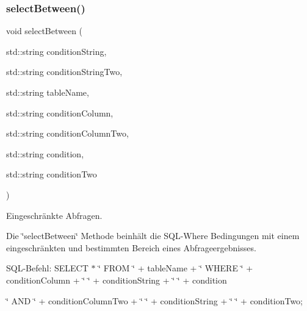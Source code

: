 \subsubsection{select\+Between()}
{\footnotesize\ttfamily void select\+Between (\begin{DoxyParamCaption}\item[{std\+::string}]{condition\+String,  }\item[{std\+::string}]{condition\+String\+Two,  }\item[{std\+::string}]{table\+Name,  }\item[{std\+::string}]{condition\+Column,  }\item[{std\+::string}]{condition\+Column\+Two,  }\item[{std\+::string}]{condition,  }\item[{std\+::string}]{condition\+Two }\end{DoxyParamCaption})}



Eingeschränkte Abfragen. 

Die \char`\"{}select\+Between\char`\"{} Methode beinhält die S\+Q\+L-\/\+Where Bedingungen mit einem eingeschränkten und bestimmten Bereich eines Abfrageergebnisses.~\newline


S\+Q\+L-\/\+Befehl\+: S\+E\+L\+E\+CT $\ast$ \char`\"{} F\+R\+O\+M \char`\"{} + table\+Name + \char`\"{} W\+H\+E\+R\+E \char`\"{} + condition\+Column + \char`\"{} \char`\"{} + condition\+String + \char`\"{} \char`\"{} + condition
\begin{DoxyItemize}
\item \char`\"{} A\+N\+D \char`\"{} + condition\+Column\+Two + \char`\"{} \char`\"{} + condition\+String + \char`\"{} \char`\"{} + condition\+Two;
\end{DoxyItemize}


